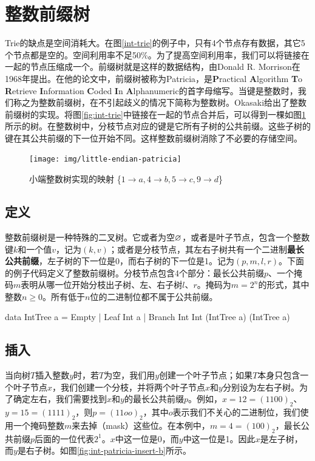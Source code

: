 \documentclass[b5paper]{ctexart}
\begin{document}
\section{整数前缀树}
\label{int-patricia}  

Trie的缺点是空间消耗大。在图\ref{int-trie}的例子中，只有4个节点存有数据，其它5个节点都是空的。空间利用率不足50\%。为了提高空间利用率，我们可以将链接在一起的节点压缩成一个。前缀树就是这样的数据结构，由Donald R. Morrison在1968年提出。在他的论文中，前缀树被称为Patricia，是\textbf{P}ractical \textbf{A}lgorithm \textbf{T}o \textbf{R}etrieve \textbf{I}nformation \textbf{C}oded \textbf{I}n \textbf{A}lphanumeric的首字母缩写\cite{patricia-morrison}。当键是整数时，我们称之为整数前缀树，在不引起歧义的情况下简称为整数树。Okasaki给出了整数前缀树的实现\cite{okasaki-int-map}。将图\ref{fig:int-trie}中链接在一起的节点合并后，可以得到一棵如图\ref{fig:little-endian-patricia}所示的树。在整数树中，分枝节点对应的键是它所有子树的公共前缀。这些子树的键在其公共前缀的下一位开始不同。这样整数前缀树消除了不必要的存储空间。

\begin{figure}[htbp]
  \centering
  \texttt{[image: img/little-endian-patricia]}
  \caption{小端整数树实现的映射
     \{$ 1 \rightarrow a, 4 \rightarrow b, 5 \rightarrow c, 9 \rightarrow d$\}}
  \label{fig:little-endian-patricia}
\end{figure}

\subsection{定义}

整数前缀树是一种特殊的二叉树。它或者为空$\varnothing$，或者是叶子节点，包含一个整数键$k$和一个值$v$，记为$(k, v)$；或者是分枝节点，其左右子树共有一个二进制\textbf{最长公共前缀}，左子树的下一位是0，而右子树的下一位是1。记为$(p, m, l, r)$。下面的例子代码定义了整数前缀树。分枝节点包含4个部分：最长公共前缀$p$、一个掩码$m$表明从哪一位开始分枝出子树、左、右子树$l$、$r$。掩码为$m = 2^n$的形式，其中整数$n \geq 0$。所有低于$n$位的二进制位都不属于公共前缀。

\begin{Haskell}
data IntTree a = Empty
               | Leaf Int a
               | Branch Int Int (IntTree a) (IntTree a)
\end{Haskell}

\subsection{插入}
当向树$T$插入整数$y$时，若$T$为空，我们用$y$创建一个叶子节点；如果$T$本身只包含一个叶子节点$x$，我们创建一个分枝，并将两个叶子节点$x$和$y$分别设为左右子树。为了确定左右，我们需要找到$x$和$y$的最长公共前缀$p$。例如，$x = 12 = (1100)_2$、$y = 15 = (1111)_2$，则$p = (11oo)_2$，其中$o$表示我们不关心的二进制位，我们使用一个掩码整数$m$来去掉（mask）这些位。在本例中，$m = 4 = (100)_2$，最长公共前缀$p$后面的一位代表$2^1$。$x$中这一位是0，而$y$中这一位是1。因此$x$是左子树，而$y$是右子树。如图\ref{fig:int-patricia-insert-b}所示。
\end{document}
